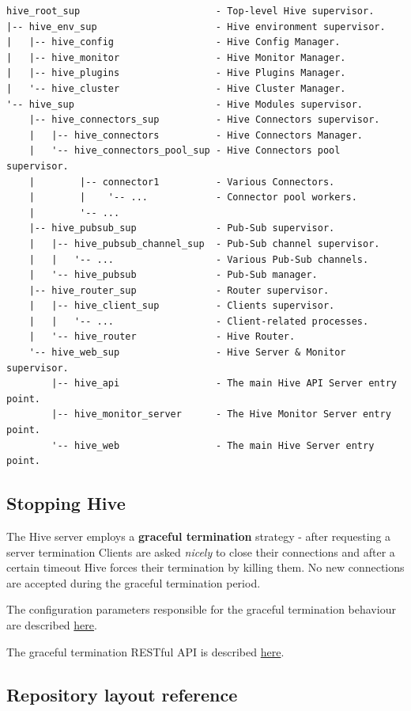 \documentclass[a4paper]{article}
\begin{document}
\begin{verbatim}
hive_root_sup                        - Top-level Hive supervisor.
|-- hive_env_sup                     - Hive environment supervisor.
|   |-- hive_config                  - Hive Config Manager.
|   |-- hive_monitor                 - Hive Monitor Manager.
|   |-- hive_plugins                 - Hive Plugins Manager.
|   '-- hive_cluster                 - Hive Cluster Manager.
'-- hive_sup                         - Hive Modules supervisor.
    |-- hive_connectors_sup          - Hive Connectors supervisor.
    |   |-- hive_connectors          - Hive Connectors Manager.
    |   '-- hive_connectors_pool_sup - Hive Connectors pool supervisor.
    |        |-- connector1          - Various Connectors.
    |        |    '-- ...            - Connector pool workers.
    |        '-- ...
    |-- hive_pubsub_sup              - Pub-Sub supervisor.
    |   |-- hive_pubsub_channel_sup  - Pub-Sub channel supervisor.
    |   |   '-- ...                  - Various Pub-Sub channels.
    |   '-- hive_pubsub              - Pub-Sub manager.
    |-- hive_router_sup              - Router supervisor.
    |   |-- hive_client_sup          - Clients supervisor.
    |   |   '-- ...                  - Client-related processes.
    |   '-- hive_router              - Hive Router.
    '-- hive_web_sup                 - Hive Server & Monitor supervisor.
        |-- hive_api                 - The main Hive API Server entry point.
        |-- hive_monitor_server      - The Hive Monitor Server entry point.
        '-- hive_web                 - The main Hive Server entry point.
\end{verbatim}
\subsection{Stopping Hive}
\label{sec-2-4}

The Hive server employs a \textbf{graceful termination} strategy - after requesting a server termination Clients are asked \emph{nicely} to close their connections and after a certain timeout Hive forces their termination by killing them. No new connections are accepted during the graceful termination period.

\noindent
The configuration parameters responsible for the graceful termination behaviour are described \hyperref[ref-graceful_config]{here}.

\noindent
The graceful termination RESTful API is described \hyperref[sec-6-1-2]{here}.
\subsection{Repository layout reference}
\label{sec-2-5}
\end{document}
